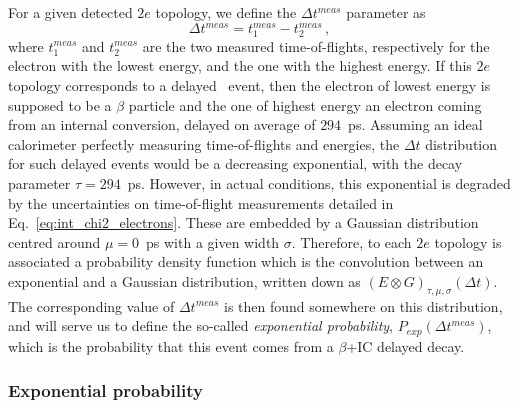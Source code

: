 For a given detected $2e$ topology, we define the $\Delta t^{meas}$ parameter as
\begin{equation}
  \Delta t^{meas} = t_{1}^{meas}-t_{2}^{meas}\,,
  \label{eq:time_diff}
\end{equation}
where $t^{meas}_1$ and $t^{meas}_2$ are the two measured time-of-flights, respectively for the electron with the lowest energy, and the one with the highest energy.
If this $2e$ topology corresponds to a delayed \Tl\ event, then the electron of lowest energy is supposed to be a $\beta$ particle and the one of highest energy an electron coming from an internal conversion, delayed on average of $294$~ps.
Assuming an ideal calorimeter perfectly measuring time-of-flights and energies, the $\Delta t$ distribution for such delayed events would be a decreasing exponential, with the decay parameter ${\tau=294}$~ps.
However, in actual conditions, this exponential is degraded by the uncertainties on time-of-flight measurements detailed in Eq.~\eqref{eq:int_chi2_electrons}.
These are embedded by a Gaussian distribution centred around ${\mu=0}$~ps with a given width $\sigma$.
Therefore, to each $2e$ topology is associated a probability density function which is the convolution between an exponential and a Gaussian distribution, written down as ${(E \otimes G)_{\tau,\mu,\sigma}(\Delta t)}$.
The corresponding value of $\Delta t^{meas}$ is then found somewhere on this distribution, and will serve us to define the so-called \emph{exponential probability}, $P_{exp}(\Delta t^{meas})$, which is the probability that this event comes from a $\beta$+IC delayed decay.


\subsubsection{Exponential probability}

